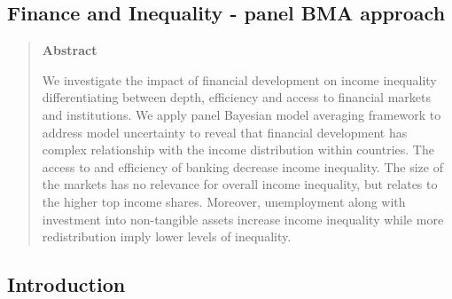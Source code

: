\begin{refsection}
\chapter{Finance and Inequality - panel BMA approach}
\label{ch4}

\begin{quote}
\begin{center}\textbf{Abstract}\end{center}
	We investigate the impact of financial development on income inequality differentiating between depth, efficiency and access to financial markets and institutions. We apply panel Bayesian model averaging framework to address model uncertainty to reveal that financial development has complex relationship with the income distribution within countries. The access to and efficiency of banking decrease income inequality. The size of the markets has no relevance for overall income inequality, but relates to the higher top income shares. Moreover, unemployment along with investment into non-tangible assets increase income inequality while more redistribution imply lower levels of inequality.  
	\end{quote}

\newpage



\section{Introduction}
\label{ch4sec:intro}


\end{refsection}
